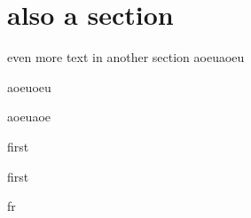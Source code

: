 \section{also a section}
even more text in another section
aoeuaoeu

aoeuoeu \cite{Hansen_2015}

aoeuaoe \cite{Hansen_2011}

first

first

fr

